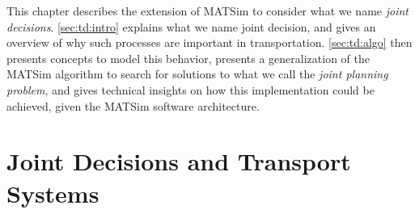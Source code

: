 { %


\newcommand\authoranddate{\citet}
\renewcommand\cite\citep

\newcommand\eg{\emph{e.g.}\xspace}
\newcommand\ie{\emph{i.e.}\xspace}
\newcommand\pudptw{Pick-Up and Delivery Problem With Time Windows\xspace}
\newcommand\structeqmodel{structural equation model\xspace}
\newcommand\ga{genetic algorithm\xspace}
\newcommand\gas{genetic algorithms\xspace}
\newcommand\Gas{Genetic algorithms\xspace}
\newcommand\mz{National Travel Survey\xspace}
\newcommand\matsim{MATSim\xspace}

\renewcommand\todo[1]{}

\newcommand\insfig[2]{%
	\insfigwidth{#1}{#2}{.8\textwidth}
}
\newcommand\insfigwidth[3]{%
\createfigure{#1}{#1}{}{%
		\texttt{[image: extending/figures/Jointtrips/\#2]}%
		}{}%
}

\newcommand\inssubfigwidth[3]{%
\createsubfigure{#2}{%
		\texttt{[image: extending/figures/Jointtrips/\#3]}%
		}{}{\quad}%
}
\newcommand\inssubfig[2]{%
\inssubfigwidth{.46\textwidth}{#1}{#2}%
}
\newcommand\insfigwithsubfigs[2]{%
\createfigure{#1}{#1}{}{%
		#2%
		}{}%
}

This chapter describes the extension of \matsim to consider what we name \emph{joint decisions}.
\cref{sec:td:intro} explains what we name joint decision, and gives an overview of why such processes
are important in transportation.
\cref{sec:td:algo} then presents concepts to model this behavior,
presents a generalization of the \matsim algorithm to search for solutions to what
we call the \emph{joint planning problem},
and gives technical insights on how this implementation could be achieved,
given the \matsim software architecture.

\section{Joint Decisions and Transport Systems\label{sec:td:intro}}
}
